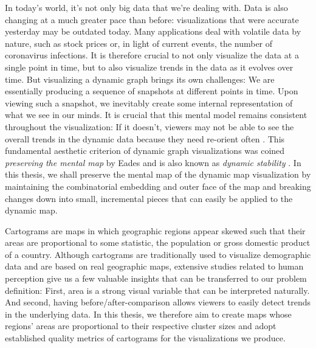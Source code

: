 In today's world, it's not only big data that we're dealing with.
Data is also changing at a much greater pace than before: visualizations that were accurate yesterday may be outdated today.
Many applications deal with volatile data by nature, such as stock prices or, in light of current events, the number of coronavirus infections.
It is therefore crucial to not only visualize the data at a single point in time, but to also visualize trends in the data as it evolves over time.
But visualizing a dynamic graph brings its own challenges:
We are essentially producing a sequence of snapshots at different points in time.
Upon viewing such a snapshot, we inevitably create some internal representation of what we see in our minds.
It is crucial that this mental model remains consistent throughout the visualization:
If it doesn't, viewers may not be able to see the overall trends in the dynamic data because they need re-orient often \cite{bohringer1990using} \cite{lee2006mental} \cite{purchase2006important}.
This fundamental aesthetic criterion of dynamic graph visualizations was coined \emph{preserving the mental map} by Eades \etal{} \cite{eades1991preserving} \cite{misue1995layout} and is also known as \emph{dynamic stability} \cite{diehl2002graphs}.
In this thesis, we shall preserve the mental map of the dynamic map visualization by maintaining the combinatorial embedding and outer face of the map and breaking changes down into small, incremental pieces that can easily be applied to the dynamic map.

Cartograms are maps in which geographic regions appear skewed such that their areas are proportional to some statistic, \eg{} the population or gross domestic product of a country.
Although cartograms are traditionally used to visualize demographic data and are based on real geographic maps, extensive studies related to human perception \cite{nusrat2016state} \cite{nusrat2018evaluating} give us a few valuable insights that can be transferred to our problem definition:
First, area is a strong visual variable that can be interpreted naturally.
And second, having before/after-comparison allows viewers to easily detect trends in the underlying data.
In this thesis, we therefore aim to create maps whose regions' areas are proportional to their respective cluster sizes and adopt established quality metrics of cartograms for the visualizations we produce.

